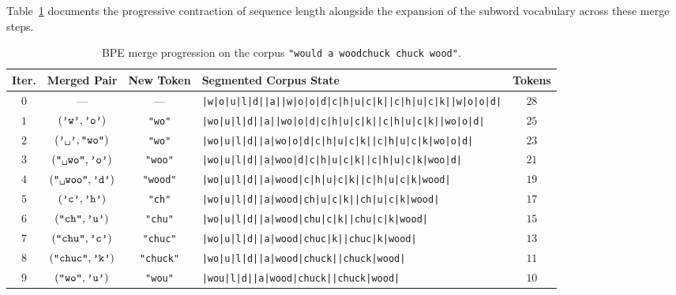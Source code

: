 \documentclass[../../../main.tex]{subfiles}
\begin{document}
Table~\ref{tab:bpe_merge_progression} documents the progressive contraction of sequence length alongside the expansion of the subword vocabulary across these merge steps.

\begin{table}[htbp]
\centering
\small
\caption{BPE merge progression on the corpus \texttt{"would a woodchuck chuck wood"}.}
\label{tab:bpe_merge_progression}
\begin{tabularx}{\textwidth}{c c c X c}
\toprule
\textbf{Iter.} & \textbf{Merged Pair} & \textbf{New Token} & \textbf{Segmented Corpus State} & \textbf{Tokens} \\
\midrule
$0$ & --- & --- & \texttt{|w|o|u|l|d|\textvisiblespace{}|a|\textvisiblespace{}|w|o|o|d|c|h|u|c|k|\textvisiblespace{}|c|h|u|c|k|\textvisiblespace{}|w|o|o|d|} & $28$ \\
$1$ & $(\text{\texttt{'w'}}, \text{\texttt{'o'}})$ & \texttt{"wo"} & \texttt{|wo|u|l|d|\textvisiblespace{}|a|\textvisiblespace{}|wo|o|d|c|h|u|c|k|\textvisiblespace{}|c|h|u|c|k|\textvisiblespace{}|wo|o|d|} & $25$ \\
$2$ & $(\text{\texttt{'\textvisiblespace{}'}}, \text{\texttt{"wo"}})$ & \texttt{"\textvisiblespace{}wo"} & \texttt{|wo|u|l|d|\textvisiblespace{}|a|\textvisiblespace{}wo|o|d|c|h|u|c|k|\textvisiblespace{}|c|h|u|c|k|\textvisiblespace{}wo|o|d|} & $23$ \\
$3$ & $(\text{\texttt{"\textvisiblespace{}wo"}}, \text{\texttt{'o'}})$ & \texttt{"\textvisiblespace{}woo"} & \texttt{|wo|u|l|d|\textvisiblespace{}|a|\textvisiblespace{}woo|d|c|h|u|c|k|\textvisiblespace{}|c|h|u|c|k|\textvisiblespace{}woo|d|} & $21$ \\
$4$ & $(\text{\texttt{"\textvisiblespace{}woo"}}, \text{\texttt{'d'}})$ & \texttt{"\textvisiblespace{}wood"} & \texttt{|wo|u|l|d|\textvisiblespace{}|a|\textvisiblespace{}wood|c|h|u|c|k|\textvisiblespace{}|c|h|u|c|k|\textvisiblespace{}wood|} & $19$ \\
$5$ & $(\text{\texttt{'c'}}, \text{\texttt{'h'}})$ & \texttt{"ch"} & \texttt{|wo|u|l|d|\textvisiblespace{}|a|\textvisiblespace{}wood|ch|u|c|k|\textvisiblespace{}|ch|u|c|k|\textvisiblespace{}wood|} & $17$ \\
$6$ & $(\text{\texttt{"ch"}}, \text{\texttt{'u'}})$ & \texttt{"chu"} & \texttt{|wo|u|l|d|\textvisiblespace{}|a|\textvisiblespace{}wood|chu|c|k|\textvisiblespace{}|chu|c|k|\textvisiblespace{}wood|} & $15$ \\
$7$ & $(\text{\texttt{"chu"}}, \text{\texttt{'c'}})$ & \texttt{"chuc"} & \texttt{|wo|u|l|d|\textvisiblespace{}|a|\textvisiblespace{}wood|chuc|k|\textvisiblespace{}|chuc|k|\textvisiblespace{}wood|} & $13$ \\
$8$ & $(\text{\texttt{"chuc"}}, \text{\texttt{'k'}})$ & \texttt{"chuck"} & \texttt{|wo|u|l|d|\textvisiblespace{}|a|\textvisiblespace{}wood|chuck|\textvisiblespace{}|chuck|\textvisiblespace{}wood|} & $11$ \\
$9$ & $(\text{\texttt{"wo"}}, \text{\texttt{'u'}})$ & \texttt{"wou"} & \texttt{|wou|l|d|\textvisiblespace{}|a|\textvisiblespace{}wood|chuck|\textvisiblespace{}|chuck|\textvisiblespace{}wood|} & $10$ \\
\bottomrule
\end{tabularx}
\end{table}
\end{document}
